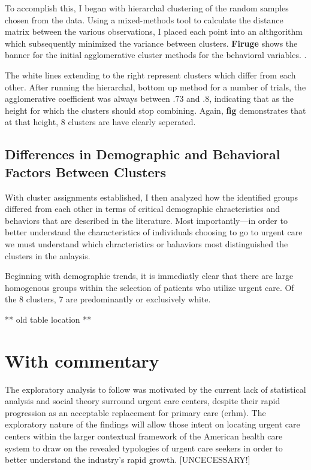\documentclass[12pt,twoside]{reedthesis}
\begin{document}
  To accomplish this, I began with hierarchal clustering of the random
  samples chosen from the data. Using a mixed-methods tool to calculate
  the distance matrix between the various observations, I placed each
  point into an althgorithm which subsequently minimized the variance
  between clusters. \textbf{Firuge} shows the banner for the initial
  agglomerative cluster methods for the behavioral variables. .
  
  The white lines extending to the right represent clusters which differ
  from each other. After running the hierarchal, bottom up method for a
  number of trials, the agglomerative coefficient was always between .73
  and .8, indicating that as the height for which the clusters should stop
  combining. Again, \textbf{fig} demonstrates that at that height, 8
  clusters are have clearly seperated.
  
  \subsection{Differences in Demographic and Behavioral Factors Between
  Clusters}\label{differences-in-demographic-and-behavioral-factors-between-clusters}
  
  With cluster assignments established, I then analyzed how the identified
  groups differed from each other in terms of critical demographic
  chracteristics and behaviors that are described in the literature. Most
  importantly---in order to better understand the characteristics of
  individuals choosing to go to urgent care we must understand which
  chracteristics or bahaviors most distinguished the clusters in the
  anlaysis.
  
  Beginning with demographic trends, it is immediatly clear that there are
  large homogenous groups within the selection of patients who utilize
  urgent care. Of the 8 clusters, 7 are predominantly or exclusively
  white.
  
  ** old table location **
  
  \section{With commentary}\label{with-commentary}
  
  The exploratory analysis to follow was motivated by the current lack of
  statistical analysis and social theory surround urgent care centers,
  despite their rapid progression as an acceptable replacement for primary
  care (erhm). The exploratory nature of the findings will allow those
  intent on locating urgent care centers within the larger contextual
  framework of the American health care system to draw on the revealed
  typologies of urgent care seekers in order to better understand the
  industry's rapid growth. {[}UNCECESSARY!{]}
  
\end{document}
